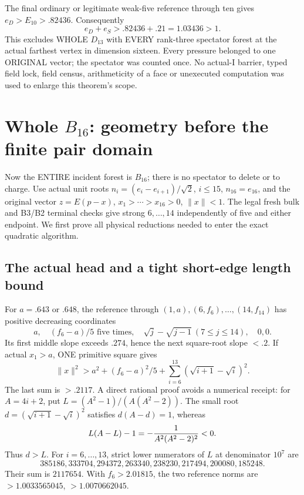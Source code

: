 \documentclass[11pt]{article}
\begin{document}
The final ordinary or legitimate weak-five
reference through ten gives \(e_D>E_{10}>.82436\).
Consequently
\[
                         e_D+e_S>.82436+.21=1.03436>1.
\]
This excludes WHOLE \(D_{13}\) with EVERY rank-three
spectator forest at the actual farthest vertex in
dimension sixteen.
Every pressure belonged to one ORIGINAL vector;
the spectator was counted once.
No actual-I barrier, typed field lock, field census,
arithmeticity of a face or unexecuted computation
was used to enlarge this theorem's scope.

\section{Whole \(B_{16}\): geometry before the finite pair domain}
\label{app:arithwholeB16}

Now the ENTIRE incident forest is \(B_{16}\);
there is no spectator to delete or to charge.
Use actual unit roots
\(n_i=(e_i-e_{i+1})/\sqrt2\), \(i\le15\),
\(n_{16}=e_{16}\), and the original vector
\(z=E(p-x)\), \(x_1>\cdots>x_{16}>0\), \(\|x\|<1\).
The legal fresh bulk and B3/B2 terminal checks
give strong \(6,\ldots,14\) independently of five
and either endpoint.
We first prove all physical reductions needed
to enter the exact quadratic algorithm.

\subsection{The actual head and a tight short-edge length bound}
\label{app:arithB16edges}

For \(a=.643\) or \(.648\), the reference through
\((1,a),(6,f_6),\ldots,(14,f_{14})\) has positive
decreasing coordinates
\[
 a,\quad(f_6-a)/5\text{ five times},\quad
 \sqrt j-\sqrt{j-1}\ (7\le j\le14),\quad0,0 .
\]
Its first middle slope exceeds \(.274\), hence
the next square-root slope \(<.2\).
If actual \(x_1>a\), ONE primitive square gives
\[
 \|x\|^2>
 a^2+(f_6-a)^2/5+
             \sum_{i=6}^{13}(\sqrt{i+1}-\sqrt i)^2.
\]
The last sum is \(>.2117\).
A direct rational proof avoids a numerical receipt:
for \(A=4i+2\), put
\(L=(A^2-1)/(A(A^2-2))\).
The small root \(d=(\sqrt{i+1}-\sqrt i)^2\)
satisfies \(d(A-d)=1\), whereas
\[
                 L(A-L)-1=-{1\over A^2(A^2-2)^2}<0 .
\]
Thus \(d>L\).
For \(i=6,\ldots,13\), strict lower numerators
of \(L\) at denominator \(10^7\) are
\[
 385186,333704,294372,263340,238230,217494,200080,185248 .
\]
Their sum is \(2117654\).
With \(f_6>2.01815\), the two reference norms are
\(>1.0033565045\), \(>1.0070662045\).
\end{document}
